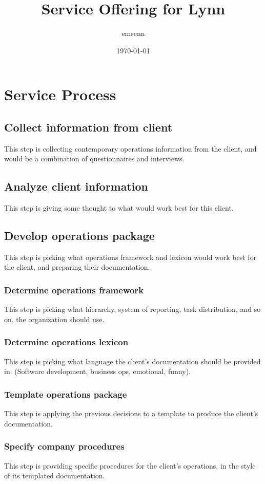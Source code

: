 \documentclass[11pt]{article}
\author{emsenn}
\date{\today}
\title{Service Offering for Lynn}
\begin{document}
\maketitle
\tableofcontents

\section{Service Process}
\label{sec-1}
\subsection{{\bfseries\sffamily Collect} information from client}
\label{sec-1-1}
This step is collecting contemporary operations information
from the client, and would be a combination of questionnaires
and interviews.
\subsection{{\bfseries\sffamily Analyze} client information}
\label{sec-1-2}
This step is giving some thought to what would work best for
this client.
\subsection{{\bfseries\sffamily Develop} operations package}
\label{sec-1-3}
This step is picking what operations framework and lexicon
would work best for the client, and preparing their
documentation.
\subsubsection{{\bfseries\sffamily Determine} operations framework}
\label{sec-1-3-1}
This step is picking what hierarchy, system of reporting, task
distribution, and so on, the organization should use.
\subsubsection{{\bfseries\sffamily Determine} operations lexicon}
\label{sec-1-3-2}
This step is picking what language the client's documentation
should be provided in.  (Software development, business ops,
emotional, funny).
\subsubsection{{\bfseries\sffamily Template} operations package}
\label{sec-1-3-3}
This step is applying the previous decisions to a template to
produce the client's documentation.
\subsubsection{{\bfseries\sffamily Specify} company procedures}
\label{sec-1-3-4}
This step is providing specific procedures for the client's
operations, in the style of its templated documentation.
\end{document}
